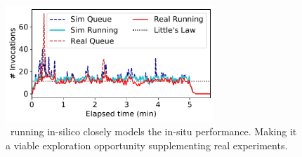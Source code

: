 \begin{figure}
  \centering
  \includegraphics[width=0.7\textwidth]{iluvatar/graphs/trace-compare/baseline/minheap_ed/16/paper-status.pdf}
  \caption{\sysname~running in-silico closely models the in-situ performance. Making it a viable exploration opportunity supplementing real experiments.}
  \label{fig:sim-vs-live-little}
\end{figure}

